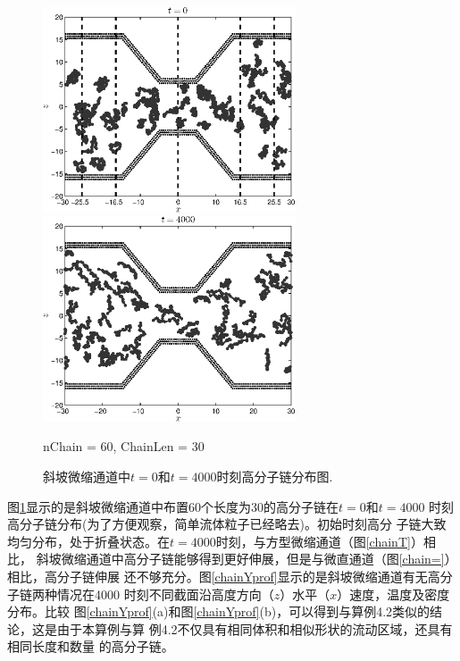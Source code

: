 \documentclass[twoside,12pt]{article}
\begin{document}
\begin{figure}[!htb]
\centering
\begin{minipage}[c]{0.5\textwidth}
\centering
\includegraphics[width=7.5cm]{./figures/chainY0s.eps}
\end{minipage}%
\begin{minipage}[c]{0.5\textwidth}
\centering
\includegraphics[width=7.5cm]{./figures/chainY4000s.eps}
\end{minipage}
\small nChain = 60, ChainLen = 30\\
\caption{\label{chainY}\small 斜坡微缩通道中$t=0$和$t=4000$时刻高分子链分布图.}
\end{figure}

图\ref{chainY}显示的是斜坡微缩通道中布置60个长度为30的高分子链在$t=0$和$t=4000$ 时刻高分子链分布(为了方便观察，简单流体粒子已经略去)。初始时刻高分
子链大致均匀分布，处于折叠状态。在$t=4000$时刻，与方型微缩通道（图\ref{chainT}）相比， 斜坡微缩通道中高分子链能够得到更好伸展，但是与微直通道（图\ref{chain=}）相比，高分子链伸展
还不够充分。图\ref{chainYprof}显示的是斜坡微缩通道有无高分子链两种情况在4000 时刻不同截面沿高度方向（$z$）水平（$x$）速度，温度及密度分布。比较
图\ref{chainYprof}(a)和图\ref{chainYprof}(b)，可以得到与算例4.2类似的结论，这是由于本算例与算
例4.2不仅具有相同体积和相似形状的流动区域，还具有相同长度和数量
的高分子链。
\end{document}
